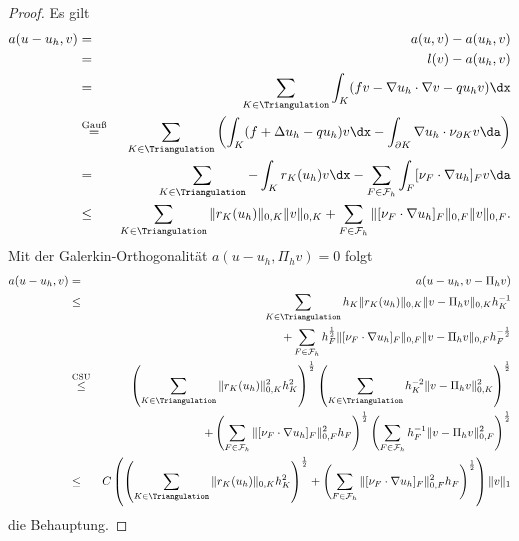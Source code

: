 \begin{proof}
    Es gilt
    \begin{eqnarray*}
            a(u - u_h, v)
        &=& a(u, v) - a(u_h, v) \\
        &=& l(v) - a(u_h, v) \\
        &=& \sum_{K\in\Triangulation} \int_K (fv - \nabla u_h \cdot \nabla v -
            q u_h v) \dx \\
        &\stackrel{\text{Gauß}}{=}&
            \sum_{K\in\Triangulation} \left(\int_K (f + \Delta u_h - q u_h) v
            \dx - \int_{\partial K} \nabla u_h \cdot \nu_{\partial K} v \da
            \right)\\
        &=& \sum_{K\in\Triangulation} -\int_K r_K(u_h) v \dx -
            \sum_{F\in\mathcal{F}_h} \int_F [\nu_F \cdot \nabla u_h]_F v \da \\
        &\le& \sum_{K\in\Triangulation} \|r_K(u_h)\|_{0,K} \|v\|_{0,K} +
              \sum_{F\in\mathcal{F}_h} \|[\nu_F \cdot \nabla u_h]_F\|_{0,F}
              \|v\|_{0,F}.
    \end{eqnarray*}
    Mit der Galerkin-Orthogonalität $a(u - u_h, \Pi_h v) = 0$ folgt
    \begin{eqnarray*}
            a(u - u_h, v)
        &=& a(u - u_h, v - \Pi_h v) \\
        &\le& \sum_{K\in\Triangulation} h_K \|r_K(u_h)\|_{0,K} \|v -
              \Pi_h v\|_{0,K} h_K^{-1} \\
            &&+ \sum_{F\in\mathcal{F}_h} h_F^\frac{1}{2}
              \|[\nu_F \cdot \nabla u_h]_F\|_{0,F} \|v - \Pi_h v\|_{0,F}
              h_F^{-\frac{1}{2}} \\
        &\stackrel{\text{CSU}}{\le}&
              \left(\sum_{K\in\Triangulation} \|r_K(u_h)\|_{0,K}^2 h_K^2\right)
              ^\frac{1}{2} \left(\sum_{K\in\Triangulation} h_K^{-2} \|v - 
              \Pi_h v\|_{0,K}^2\right)^\frac{1}{2} \\
            &&+ \left(\sum_{F\in\mathcal{F}_h} \|[\nu_F \cdot \nabla u_h]_F\|
              _{0,F}^2 h_F\right)^\frac{1}{2} \left(\sum_{F\in\mathcal{F}_h}
              h_F^{-1} \|v - \Pi_h v \|_{0,F}^2\right)^\frac{1}{2} \\
        &\le& C \left(\left(\sum_{K\in\Triangulation} \|r_K(u_h)\|_{0,K} h_K^2
              \right)^\frac{1}{2} + \left(\sum_{F\in\mathcal{F}_h} \|[\nu_F
              \cdot \nabla u_h]_F\|_{0,F}^2 h_F\right)^\frac{1}{2}\right)
              \| v\|_1
    \end{eqnarray*}
    die Behauptung.
\end{proof}


